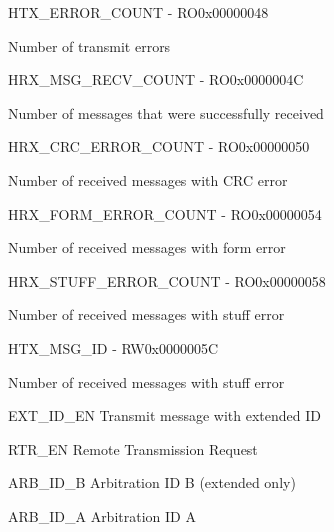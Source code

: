\documentclass{article}
\begin{document}
\begin{register}{H}{TX{\_}ERROR{\_}COUNT - RO}{0x00000048}  \par Number of transmit errors \regnewline
  \label{TX_ERROR_COUNT}
\regnewline
\end{register}

\begin{register}{H}{RX{\_}MSG{\_}RECV{\_}COUNT - RO}{0x0000004C}  \par Number of messages that were successfully received \regnewline
  \label{RX_MSG_RECV_COUNT}
\regnewline
\end{register}

\begin{register}{H}{RX{\_}CRC{\_}ERROR{\_}COUNT - RO}{0x00000050}  \par Number of received messages with CRC error \regnewline
  \label{RX_CRC_ERROR_COUNT}
\regnewline
\end{register}

\begin{register}{H}{RX{\_}FORM{\_}ERROR{\_}COUNT - RO}{0x00000054}  \par Number of received messages with form error \regnewline
  \label{RX_FORM_ERROR_COUNT}
\regnewline
\end{register}

\begin{register}{H}{RX{\_}STUFF{\_}ERROR{\_}COUNT - RO}{0x00000058}  \par Number of received messages with stuff error \regnewline
  \label{RX_STUFF_ERROR_COUNT}
\regnewline
\end{register}

\begin{register}{H}{TX{\_}MSG{\_}ID - RW}{0x0000005C}  \par Number of received messages with stuff error \regnewline
  \label{TX_MSG_ID}
\regnewline
  \begin{regdesc}\begin{reglist}[EXT{\_}ID{\_}EN]
    \item [EXT{\_}ID{\_}EN] Transmit message with extended ID    \item [RTR{\_}EN] Remote Transmission Request    \item [ARB{\_}ID{\_}B] Arbitration ID B (extended only)    \item [ARB{\_}ID{\_}A] Arbitration ID A  \end{reglist}\end{regdesc}
\end{register}
\end{document}
